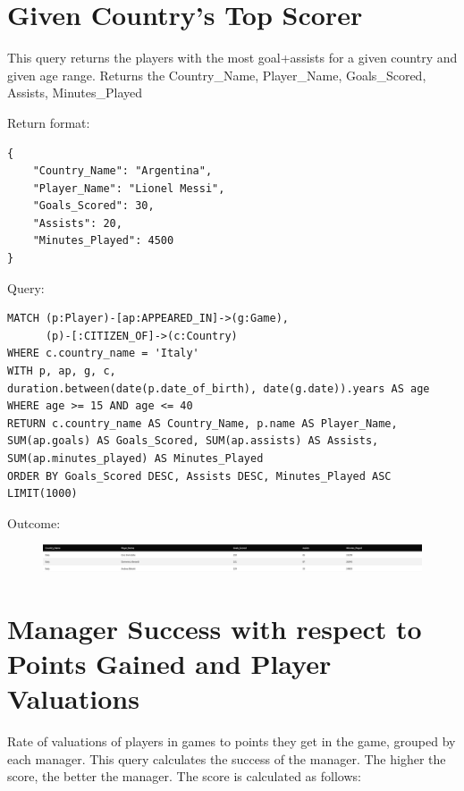 \documentclass{Configuration_Files/PoliMi3i_thesis}
\begin{document}
\section{Given Country's Top Scorer}
This query returns the players with the most goal+assists for a given country and given age range.
Returns the Country\_Name, Player\_Name, Goals\_Scored, Assists, Minutes\_Played

Return format:
\begin{lstlisting}[style=json]
{
    "Country_Name": "Argentina",
    "Player_Name": "Lionel Messi",
    "Goals_Scored": 30,
    "Assists": 20,
    "Minutes_Played": 4500
}
\end{lstlisting}


Query:

\begin{lstlisting}[language=Cypher]
MATCH (p:Player)-[ap:APPEARED_IN]->(g:Game),
      (p)-[:CITIZEN_OF]->(c:Country)
WHERE c.country_name = 'Italy'
WITH p, ap, g, c,
duration.between(date(p.date_of_birth), date(g.date)).years AS age
WHERE age >= 15 AND age <= 40
RETURN c.country_name AS Country_Name, p.name AS Player_Name, SUM(ap.goals) AS Goals_Scored, SUM(ap.assists) AS Assists, SUM(ap.minutes_played) AS Minutes_Played
ORDER BY Goals_Scored DESC, Assists DESC, Minutes_Played ASC
LIMIT(1000)
\end{lstlisting}


Outcome:
\begin{figure}[H]
    \centering
    \includegraphics[width=\linewidth]{Project Template/Images/query_output/q11.png}
\end{figure}













\section{Manager Success with respect to Points Gained and Player Valuations}
Rate of valuations of players in games to points they get in the game, grouped by each manager. This query calculates the success of the manager. The higher the score, the better the manager. The score is calculated as follows:
\end{document}
